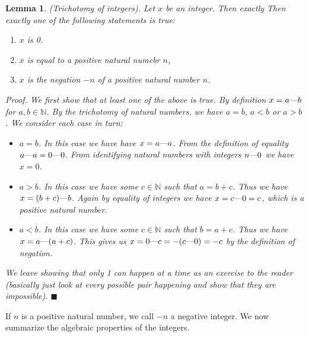 \documentclass{article}
\newtheorem{lemma}{Lemma}[subsection]
\newcommand{\N}{\mathbb{N}}
\newcommand{\mem}{\text{\textemdash}} %
\let\it\textit
\begin{document}
\begin{lemma}
	(Trichotomy of integers). Let $x$ be an integer. Then exactly	
	Then exactly one of the following statements is true:
	\begin{enumerate}
		\item $x$ is 0.
		\item $x$ is equal to a positive natural numebr $n$,
		\item $x$ is the negation $-n$ of a positive natural 
			number $n$.
	\end{enumerate}

	\it{Proof}. We first show that at least one of the above is true.
	By definition $x = a\mem b$ for $a,b \in \N$. By the trichotomy
	of natural numbers, we have $a = b$, $a < b$ or $a > b$. We consider 
	each case in turn:
	\begin{itemize}
		\item $a =b$. In this case we have have $x = a \mem a$.
			From the definition of equality $a \mem a = 0 \mem 0$. 
			From identifying natural numbers with integers $n \mem 0$
			we have $x = 0$.
		\item $a > b$. In this case we have some $c\in \N$ such 
			that $a = b + c$. Thus we have $x = (b+c) \mem b$. Again 
			by equality of integers we have $x = c \mem 0 = c$, 
			which is a positive natural number.
		\item $a < b$. In this case we have some $c \in \N$ such 
			that $b = a + c$. Thus we have $x = a \mem (a+c)$.
			This gives us $x = 0 \mem c = -(c \mem 0) = -c$ by 
			the definition of negation.
	\end{itemize}
	We leave showing that only 1 can happen at a time as an exercise
	to the reader (basically just look at every possible pair
	happening and show that they are impossible). \hfill $\blacksquare$
\end{lemma}

If $n$ is a positive natural number, we call $-n$ a negative integer. We
now summarize the algebraic properties of the integers.
\end{document}
